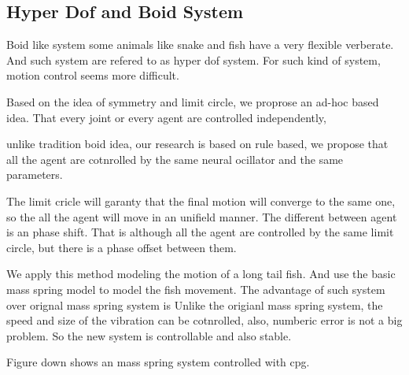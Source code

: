\subsection{Hyper Dof and Boid System}
Boid like system
some animals like snake and fish have a very flexible verberate. And such system are refered to as hyper dof system.
For such kind of system, motion control seems more difficult.

Based on the idea of symmetry and limit circle, we proprose an ad-hoc based idea.
That every joint or every agent are controlled independently,

unlike tradition boid idea,
our research is based on rule based,
 we propose that all the agent are cotnrolled by the same neural ocillator and the same parameters.

The limit cricle will garanty that the final motion will converge to the same one,
so the all the agent will move in an unifield manner.
The different between agent is an phase shift.
That is although all the agent are controlled by the same limit circle, but there is a phase offset between them.


We apply this method modeling the motion of a long tail fish.
And use the basic mass spring model to model the fish movement.
The advantage of such system over orignal mass spring system is 
Unlike the origianl mass spring system, the speed and size of the vibration can be cotnrolled,
also, numberic error is not a big problem.
So the new system is controllable and also stable.

Figure down shows an mass spring system controlled with cpg.